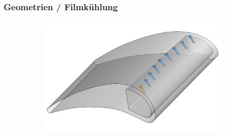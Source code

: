 \documentclass[8pt, aspectratio=169]{beamer}
\begin{document}
\begin{frame}
	\frametitle{Geometrien / Filmkühlung}
	\vspace{-0.5cm}

	\centering
	\begin{minipage}[t]{\textwidth}
		\begin{figure}[H]
			\centering
			\begin{subfigure}{.75\textwidth}
				\includegraphics[width=\textwidth]{../../tec/holes/22edit.png}
			\end{subfigure}
		\end{figure}
	\end{minipage}
	\vfill
\end{frame}
\end{document}
